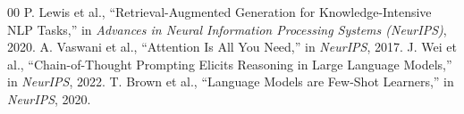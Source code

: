 \documentclass[conference]{IEEEtran}
\begin{document}
\begin{thebibliography}{00}
 P. Lewis et al., ``Retrieval-Augmented Generation for Knowledge-Intensive NLP Tasks,'' in \textit{Advances in Neural Information Processing Systems (NeurIPS)}, 2020.
 A. Vaswani et al., ``Attention Is All You Need,'' in \textit{NeurIPS}, 2017.
 J. Wei et al., ``Chain-of-Thought Prompting Elicits Reasoning in Large Language Models,'' in \textit{NeurIPS}, 2022.
 T. Brown et al., ``Language Models are Few-Shot Learners,'' in \textit{NeurIPS}, 2020.
\end{thebibliography}
\end{document}
